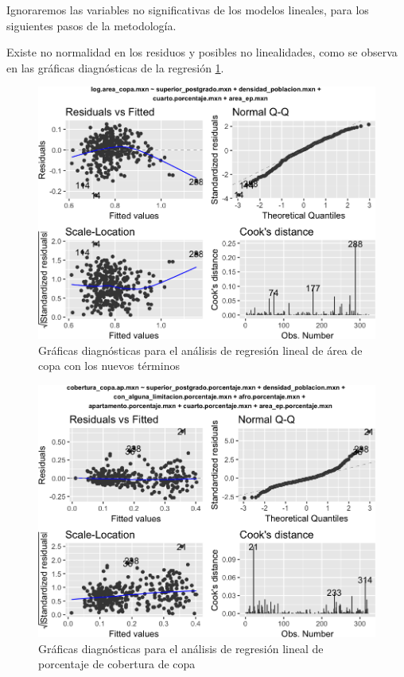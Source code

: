 \documentclass[12pt,]{book}
\begin{document}
Ignoraremos las variables no significativas de los modelos lineales,
para los siguientes pasos de la metodología.

Existe no normalidad en los residuos y posibles no linealidades, como se
observa en las gráficas diagnósticas de la regresión
\ref{fig:diagn-mod-best-lm-copa}.

\begin{figure}
\includegraphics[width=1\linewidth]{tesis-unigis_files/figure-latex/diagn-mod-best-lm-copa-1} \caption{Gráficas diagnósticas para el análisis de regresión lineal de área de copa con los nuevos términos}\label{fig:diagn-mod-best-lm-copa}
\end{figure}

\begin{figure}
\includegraphics[width=1\linewidth]{tesis-unigis_files/figure-latex/diagn-mod-best-lm-copaap-1} \caption{Gráficas diagnósticas para el análisis de regresión lineal de porcentaje de cobertura de copa}\label{fig:diagn-mod-best-lm-copaap}
\end{figure}
\end{document}
